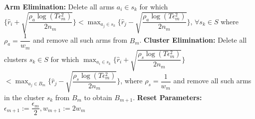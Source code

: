 \begin{algorithm}
\begin{algorithmic}[1]
\State \hspace*{2em} \textbf{Arm Elimination:}
\newline
\hspace*{2em} Delete all arms $a_{i}\in s_{k}$ for which
\newline\hspace*{2em}$\bigg\lbrace\hat{r}_{i} + \sqrt{\dfrac{\rho_{a}\log{(T\epsilon_{m}^{2})}}{2 n_{m}}} \bigg\rbrace < \max_{a_{j}\in s_{k}}\bigg\lbrace\hat{r}_{j} -\sqrt{\dfrac{\rho_{a}\log{(T\epsilon_{m}^{2})}}{2 n_{m}}} \bigg\rbrace$, $\forall s_{k}\in S$ where $\rho_{a}=\dfrac{1}{w_{m}}$ and remove all such arms from $B_{m}$.
\State \hspace*{2em} \textbf{Cluster Elimination:}
\newline
\hspace*{2em} Delete all clusters $s_{k}\in S$ for which $\max_{a_{i}\in s_{k}}\bigg\lbrace\hat{r}_{i} + \sqrt{\dfrac{\rho_{s}\log{(T\epsilon_{m}^{2})}}{2 n_{m}}}\bigg\rbrace  $\newline\hspace*{4em}$< \max_{a_{j}\in B_{m}} \bigg\lbrace\hat{r}_{j} - \sqrt{\dfrac{\rho_{s} \log{(T\epsilon_{m}^{2})}}{2 n_{m}}}\bigg\rbrace$, where $\rho_{s}=\dfrac{1}{w_{m}}$ and remove all such arms in the cluster $s_{k}$ from $B_{m}$ to obtain $B_{m+1}$.
\State \hspace*{2em} \textbf{Reset Parameters:}
\newline \hspace*{2em} $\epsilon_{m+1}:=\dfrac{\epsilon_{m}}{2},w_{m+1}:=2w_{m}$

\end{algorithmic}
\end{algorithm}
